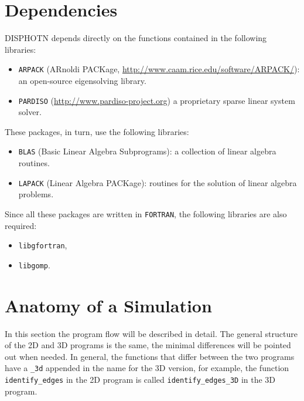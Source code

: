 \documentclass[11pt,a4paper,oneside]{article}
\begin{document}
\section{Dependencies}
DISPHOTN depends directly on the functions contained in the following libraries:
\begin{itemize}
\item {\tt ARPACK} (ARnoldi PACKage, \url{http://www.caam.rice.edu/software/ARPACK/}): an open-source eigensolving library.
\item {\tt PARDISO} (\url{http://www.pardiso-project.org}) a proprietary sparse linear system solver.
\end{itemize}
These packages, in turn, use the following libraries:
\begin{itemize}
\item {\tt BLAS} (Basic Linear Algebra Subprograms): a collection of linear algebra routines.
\item {\tt LAPACK} (Linear Algebra PACKage): routines for the solution of linear algebra problems.
\end{itemize}
Since all these packages are written in {\tt FORTRAN}, the following libraries are also required:
\begin{itemize}
\item {\tt libgfortran},
\item {\tt libgomp}.
\end{itemize}

\section{Anatomy of a Simulation}
In this section the program flow will be described in detail. The general structure of the 2D and 3D programs is the same, the minimal differences will be pointed out when needed. In general, the functions that differ between the two programs have a {\tt \_3d} appended in the name for the 3D version, for example, the function {\tt identify\_edges} in the 2D program is called {\tt identify\_edges\_3D} in the 3D program.
\end{document}
